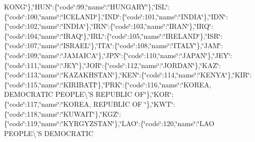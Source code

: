 {K\-O\-N\-G\char`\"{}\},\char`\"{}H\-U\-N\char`\"{}\-:\{\char`\"{}code\char`\"{}\-:99,\char`\"{}name\char`\"{}\-:\char`\"{}H\-U\-N\-G\-A\-R\-Y\char`\"{}\},\char`\"{}I\-S\-L\char`\"{}\-:\{\char`\"{}code\char`\"{}\-:100,\char`\"{}name\char`\"{}\-:\char`\"{}I\-C\-E\-L\-A\-N\-D\char`\"{}\},\char`\"{}I\-N\-D\char`\"{}\-:\{\char`\"{}code\char`\"{}\-:101,\char`\"{}name\char`\"{}\-:\char`\"{}I\-N\-D\-I\-A\char`\"{}\},\char`\"{}I\-D\-N\char`\"{}\-:\{\char`\"{}code\char`\"{}\-:102,\char`\"{}name\char`\"{}\-:\char`\"{}I\-N\-D\-I\-A\char`\"{}\},\char`\"{}I\-R\-N\char`\"{}\-:\{\char`\"{}code\char`\"{}\-:103,\char`\"{}name\char`\"{}\-:\char`\"{}I\-R\-A\-N\char`\"{}\},\char`\"{}I\-R\-Q\char`\"{}\-:\{\char`\"{}code\char`\"{}\-:104,\char`\"{}name\char`\"{}\-:\char`\"{}I\-R\-A\-Q\char`\"{}\},\char`\"{}I\-R\-L\char`\"{}\-:\{\char`\"{}code\char`\"{}\-:105,\char`\"{}name\char`\"{}\-:\char`\"{}I\-R\-E\-L\-A\-N\-D\char`\"{}\},\char`\"{}I\-S\-R\char`\"{}\-:\{\char`\"{}code\char`\"{}\-:107,\char`\"{}name\char`\"{}\-:\char`\"{}I\-S\-R\-A\-E\-L\char`\"{}\},\char`\"{}I\-T\-A\char`\"{}\-:\{\char`\"{}code\char`\"{}\-:108,\char`\"{}name\char`\"{}\-:\char`\"{}I\-T\-A\-L\-Y\char`\"{}\},\char`\"{}J\-A\-M\char`\"{}\-:\{\char`\"{}code\char`\"{}\-:109,\char`\"{}name\char`\"{}\-:\char`\"{}J\-A\-M\-A\-I\-C\-A\char`\"{}\},\char`\"{}J\-P\-N\char`\"{}\-:\{\char`\"{}code\char`\"{}\-:110,\char`\"{}name\char`\"{}\-:\char`\"{}J\-A\-P\-A\-N\char`\"{}\},\char`\"{}J\-E\-Y\char`\"{}\-:\{\char`\"{}code\char`\"{}\-:111,\char`\"{}name\char`\"{}\-:\char`\"{}J\-E\-Y\char`\"{}\},\char`\"{}J\-O\-R\char`\"{}\-:\{\char`\"{}code\char`\"{}\-:112,\char`\"{}name\char`\"{}\-:\char`\"{}J\-O\-R\-D\-A\-N\char`\"{}\},\char`\"{}K\-A\-Z\char`\"{}\-:\{\char`\"{}code\char`\"{}\-:113,\char`\"{}name\char`\"{}\-:\char`\"{}K\-A\-Z\-A\-K\-H\-S\-T\-A\-N\char`\"{}\},\char`\"{}K\-E\-N\char`\"{}\-:\{\char`\"{}code\char`\"{}\-:114,\char`\"{}name\char`\"{}\-:\char`\"{}K\-E\-N\-Y\-A\char`\"{}\},\char`\"{}K\-I\-R\char`\"{}\-:\{\char`\"{}code\char`\"{}\-:115,\char`\"{}name\char`\"{}\-:\char`\"{}K\-I\-R\-I\-B\-A\-T\-I\char`\"{}\},\char`\"{}P\-R\-K\char`\"{}\-:\{\char`\"{}code\char`\"{}\-:116,\char`\"{}name\char`\"{}\-:\char`\"{}K\-O\-R\-E\-A, D\-E\-M\-O\-C\-R\-A\-T\-I\-C P\-E\-O\-P\-L\-E\textbackslash{}'S R\-E\-P\-U\-B\-L\-I\-C O\-F\char`\"{}\},\char`\"{}K\-O\-R\char`\"{}\-:\{\char`\"{}code\char`\"{}\-:117,\char`\"{}name\char`\"{}\-:\char`\"{}K\-O\-R\-E\-A, R\-E\-P\-U\-B\-L\-I\-C O\-F \char`\"{}\},\char`\"{}K\-W\-T\char`\"{}\-:\{\char`\"{}code\char`\"{}\-:118,\char`\"{}name\char`\"{}\-:\char`\"{}K\-U\-W\-A\-I\-T\char`\"{}\},\char`\"{}K\-G\-Z\char`\"{}\-:\{\char`\"{}code\char`\"{}\-:119,\char`\"{}name\char`\"{}\-:\char`\"{}K\-Y\-R\-G\-Y\-Z\-S\-T\-A\-N\char`\"{}\},\char`\"{}L\-A\-O\char`\"{}\-:\{\char`\"{}code\char`\"{}\-:120,\char`\"{}name\char`\"{}\-:\char`\"{}L\-A\-O P\-E\-O\-P\-L\-E\textbackslash{}'S D\-E\-M\-O\-C\-R\-A\-T\-I\-C }
